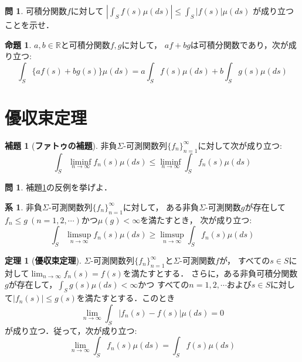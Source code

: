 \documentclass{jsreport}
\theoremstyle{definition}
\newtheorem{lem}[defi]{補題}
\newtheorem{prop}[defi]{命題}
\newtheorem{thm}[defi]{定理}
\newtheorem{cor}[defi]{系}
\newtheorem{qst}[defi]{問}
\begin{document}
\begin{qst}\label{qst_absolute_integral_and_integral_absolute}
可積分関数$f$に対して
$\displaystyle\left|\int_Sf(s)\mu(ds)\right|\leq\int_S|f(s)|\mu(ds)$
が成り立つことを示せ．
\end{qst}

\begin{prop}\label{prop_linearity_of_integrable_function_integral}
$a,b\in\mathbb{R}$と可積分関数$f,g$に対して，
$af+bg$は可積分関数であり，次が成り立つ:
\[ \int_S\{af(s)+bg(s)\}\mu(ds)=a\int_Sf(s)\mu(ds)+b\int_Sg(s)\mu(ds) \]
\end{prop}

\section{優収束定理}

\begin{lem}[\textbf{ファトゥの補題}]\label{Fatou_lemma}
非負$\Sigma$-可測関数列$\{f_n\}_{n=1}^\infty$に対して次が成り立つ:
\[ \int_S\liminf_{n\to\infty}f_n(s)\mu(ds)\leq\liminf_{n\to\infty}\int_S f_n(s)\mu(ds) \]
\end{lem}

\begin{qst}\label{qst_counterexample_of_Fatou_lemma}
補題\ref{Fatou_lemma}の反例を挙げよ．
\end{qst}

\begin{cor}\label{reverse_Fatou_lemma}
非負$\Sigma$-可測関数列$\{f_n\}_{n=1}^\infty$に対して，
ある非負$\Sigma$-可測関数$g$が存在して
$f_n \leq g\ (n=1,2,\cdots)$かつ$\mu(g)<\infty$を満たすとき，
次が成り立つ:
\[ \int_S\limsup_{n\to\infty}f_n(s)\mu(ds)\geq\limsup_{n\to\infty}\int_S f_n(s)\mu(ds) \]
\end{cor}

\begin{thm}[\textbf{優収束定理}]\label{dominated_convergence_theorem}
$\Sigma$-可測関数列$\{f_n\}_{n=1}^\infty$と$\Sigma$-可測関数$f$が，
すべての$s \in S$に対して$\displaystyle\lim_{n\to\infty}f_n(s)=f(s)$を満たすとする．
さらに，ある非負可積分関数$g$が存在して，$\displaystyle\int_Sg(s)\mu(ds)<\infty$かつ
すべての$n=1,2,\cdots$および$s \in S$に対して$|f_n(s)| \leq g(s)$を満たすとする．このとき
\[ \lim_{n\to\infty}\int_S|f_n(s)-f(s)|\mu(ds)=0 \]
が成り立つ．従って，次が成り立つ:
\[ \lim_{n\to\infty}\int_Sf_n(s)\mu(ds)=\int_Sf(s)\mu(ds) \]
\end{thm}
\end{document}
